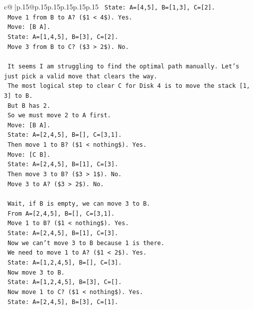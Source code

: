 \documentclass{article}
\begin{document}
{\begin{supertabular}{c@{$\;$}|p{.15\linewidth}@{}p{.15\linewidth}p{.15\linewidth}p{.15\linewidth}p{.15\linewidth}p{.15\linewidth}}
{{{\texttt{   State: A={[}4,5{]}, B={[}1,3{]}, C={[}2{]}.} \\
\texttt{   Move 1 from B to A? (\$1 < 4\$). Yes.} \\
\texttt{   Move: {[}B A{]}.} \\
\texttt{   State: A={[}1,4,5{]}, B={[}3{]}, C={[}2{]}.} \\
\texttt{   Move 3 from B to C? (\$3 > 2\$). No.} \\
\\ 
\texttt{   It seems I am struggling to find the optimal path manually. Let's just pick a valid move that clears the way.} \\
\texttt{   The most logical step to clear C for Disk 4 is to move the stack {[}1, 3{]} to B.} \\
\texttt{   But B has 2.} \\
\texttt{   So we must move 2 to A first.} \\
\texttt{   Move: {[}B A{]}.} \\
\texttt{   State: A={[}2,4,5{]}, B={[}{]}, C={[}3,1{]}.} \\
\texttt{   Then move 1 to B? (\$1 < nothing\$). Yes.} \\
\texttt{   Move: {[}C B{]}.} \\
\texttt{   State: A={[}2,4,5{]}, B={[}1{]}, C={[}3{]}.} \\
\texttt{   Then move 3 to B? (\$3 > 1\$). No.} \\
\texttt{   Move 3 to A? (\$3 > 2\$). No.} \\
\\ 
\texttt{   Wait, if B is empty, we can move 3 to B.} \\
\texttt{   From A={[}2,4,5{]}, B={[}{]}, C={[}3,1{]}.} \\
\texttt{   Move 1 to B? (\$1 < nothing\$). Yes.} \\
\texttt{   State: A={[}2,4,5{]}, B={[}1{]}, C={[}3{]}.} \\
\texttt{   Now we can't move 3 to B because 1 is there.} \\
\texttt{   We need to move 1 to A? (\$1 < 2\$). Yes.} \\
\texttt{   State: A={[}1,2,4,5{]}, B={[}{]}, C={[}3{]}.} \\
\texttt{   Now move 3 to B.} \\
\texttt{   State: A={[}1,2,4,5{]}, B={[}3{]}, C={[}{]}.} \\
\texttt{   Now move 1 to C? (\$1 < nothing\$). Yes.} \\
\texttt{   State: A={[}2,4,5{]}, B={[}3{]}, C={[}1{]}.} \\
}}}
\end{supertabular}}
\end{document}

